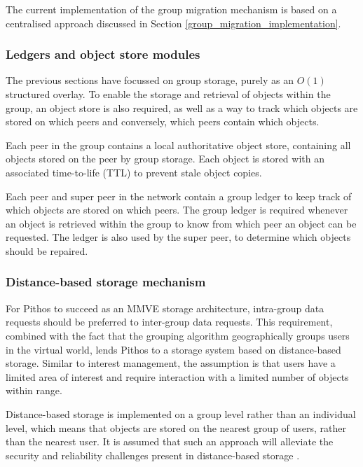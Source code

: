 The current implementation of the group migration mechanism is based on a centralised approach discussed in Section \ref{group_migration_implementation}.

\subsubsection{Ledgers and object store modules}

The previous sections have focussed on group storage, purely as an $O(1)$ structured overlay. To enable the storage and retrieval of objects within the group, an object store is also required, as well as a way to track which objects are stored on which peers and conversely, which peers contain which objects.

Each peer in the group contains a local authoritative object store, containing all objects stored on the peer by group storage. Each object is stored with an associated time-to-life (TTL) to prevent stale object copies.

Each peer and super peer in the network contain a group ledger to keep track of which objects are stored on which peers. The group ledger is required whenever an object is retrieved within the group to know from which peer an object can be requested. The ledger is also used by the super peer, to determine which objects should be repaired.

\subsubsection{Distance-based storage mechanism}
\label{distance_based_design}

For Pithos to succeed as an MMVE storage architecture, intra-group data requests should be preferred to inter-group data requests. This requirement, combined with the fact that the grouping algorithm geographically groups users in the virtual world, lends Pithos to a storage system based on distance-based storage. Similar to interest management, the assumption is that users have a limited area of interest and require interaction with a limited number of objects within range.

Distance-based storage is implemented on a group level rather than an individual level, which means that objects are stored on the nearest group of users, rather than the nearest user. It is assumed that such an approach will alleviate the security and reliability challenges present in distance-based storage \cite{gilmore_p2p_mmog_state_persistency}.

